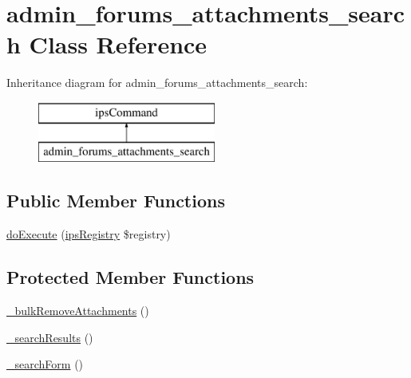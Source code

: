 \hypertarget{classadmin__forums__attachments__search}{\section{admin\-\_\-forums\-\_\-attachments\-\_\-search Class Reference}
\label{classadmin__forums__attachments__search}
}
Inheritance diagram for admin\-\_\-forums\-\_\-attachments\-\_\-search\-:\begin{figure}[H]
\begin{center}
\leavevmode
\includegraphics[height=2.000000cm]{classadmin__forums__attachments__search}
\end{center}
\end{figure}
\subsection*{Public Member Functions}
\begin{DoxyCompactItemize}
\item 
\hyperlink{classadmin__forums__attachments__search_afbc4e912a0604b94d47d66744c64d8ba}{do\-Execute} (\hyperlink{classips_registry}{ips\-Registry} \$registry)
\end{DoxyCompactItemize}
\subsection*{Protected Member Functions}
\begin{DoxyCompactItemize}
\item 
\hyperlink{classadmin__forums__attachments__search_a1f956d06ec3d17cd11ed0f808affdf12}{\-\_\-bulk\-Remove\-Attachments} ()
\item 
\hyperlink{classadmin__forums__attachments__search_a23f1adb22d43d1a136899dd9a49efc80}{\-\_\-search\-Results} ()
\item 
\hyperlink{classadmin__forums__attachments__search_a5477f8ab9668844524fc96b571f1ef2d}{\-\_\-search\-Form} ()
\end{DoxyCompactItemize}
